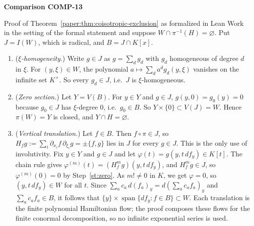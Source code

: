 \documentclass[11pt]{amsart}
\numberwithin{equation}{section}
\theoremstyle{plain}
\theoremstyle{remark}
\begin{document}
\par\bigskip\noindent{}\hypertarget{comparison-COMP-13}{\textbf{Comparison COMP-13}}\label{comparison-COMP-13}\par\smallskip
{}
\begin{AIaddition}{Proof of Theorem~\ref{paper:thm:coisotropic-exclusion} as formalized in Lean}
Work in the setting of the formal statement and suppose
$W\cap\pi^{-1}(H)=\varnothing$. Put $J=I(W)$, which is radical, and $B=J\cap K[x]$.
\begin{enumerate}[label=\textbf{Step \arabic*.},ref=\arabic*,leftmargin=*,widest=5]
\item\label{st:hom} (\emph{$\xi$-homogeneity.}) Write $g\in J$ as $g=\sum_dg_d$ with $g_d$ homogeneous of
degree $d$ in $\xi$. For $(y,\xi)\in W$, the polynomial $a\mapsto\sum_da^dg_d(y,\xi)$
vanishes on the infinite set $K^\times$. So every $g_d\in J$, i.e.\ $J$ is $\xi$-homogeneous.
\item\label{st:zero} (\emph{Zero section.}) Let $Y=V(B)$. For $y\in Y$ and $g\in J$,
$g(y,0)=g_0(y)=0$ because $g_0\in J$ has $\xi$-degree $0$, i.e.\ $g_0\in B$. So
$Y\times\{0\}\subset V(J)=W$. Hence $\pi(W)=Y$ is closed, and
$Y\cap H=\varnothing$.
\item\label{st:transl} (\emph{Vertical translation.}) Let $f\in B$. Then $f\circ\pi\in J$, so
$H_fg:=\sum_i\partial_{x_i}f\,\partial_{\xi_i}g=\pm\{f,g\}$ lies in $J$ for every $g\in J$.
This is the only use of involutivity. Fix $y\in Y$ and $g\in J$ and let
$\varphi(t)=g(y,t\,df_y)\in K[t]$. The chain rule gives
$\varphi^{(m)}(t)=(H_f^mg)(y,t\,df_y)$, and $H_f^mg\in J$, so
$\varphi^{(m)}(0)=0$ by Step~\ref{st:zero}. As $m!\neq0$ in $K$, we get $\varphi=0$,
so $(y,t\,df_y)\in W$ for all $t$. Since
$\sum_ac_a\,d(f_a)_y=d(\sum_ac_af_a)_y$ and $\sum_ac_af_a\in B$, it follows that
$\{y\}\times\operatorname{span}\{df_y:f\in B\}\subset W$. Each translation is the finite polynomial Hamiltonian flow; the proof composes
these flows for the finite conormal decomposition, so no infinite exponential series is used.

\end{enumerate}
\end{AIaddition}
\end{document}
